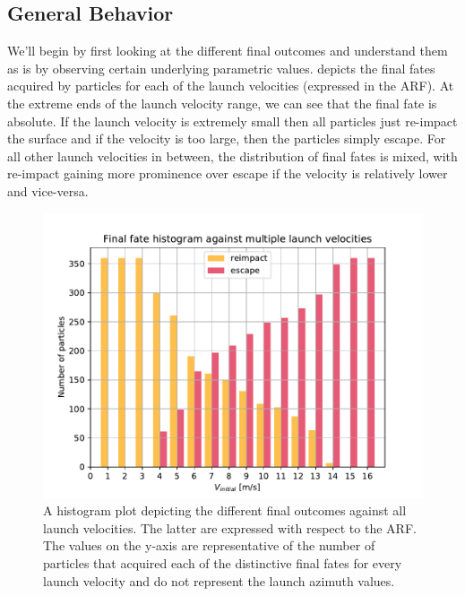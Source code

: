 \subsection{General Behavior}
\label{subsec:general_behavior_noSP}
We'll begin by first looking at the different final outcomes and understand them as is by observing certain underlying parametric values.  depicts the final fates acquired by particles for each of the launch velocities (expressed in the \gls{ARF}). At the extreme ends of the launch velocity range, we can see that the final fate is absolute. If the launch velocity is extremely small then all particles just re-impact the surface and if the velocity is too large, then the particles simply escape. For all other launch velocities in between, the distribution of final fates is mixed, with re-impact gaining more prominence over escape if the velocity is relatively lower and vice-versa.
\begin{figure}[htb]
\centering
\captionsetup{justification=centering}
\includegraphics[width=\textwidth, height=0.4\textheight, keepaspectratio=true]{Images/longest_edge_no_perturbations/final_fate_histogram_all_velocities.pdf}
\caption{A histogram plot depicting the different final outcomes against all launch velocities. The latter are expressed with respect to the \gls{ARF}. The values on the y-axis are representative of the number of particles that acquired each of the distinctive final fates for every launch velocity and do not represent the launch azimuth values.}
\label{fig:final_fate_hist_noSP}
\end{figure}
\FloatBarrier
